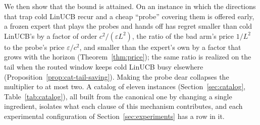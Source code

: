 \documentclass{article}
\theoremstyle{definition}
\theoremstyle{remark}
\newcommand{\eps}{\varepsilon}
\theoremstyle{remark}
\begin{document}
We then show that the bound is attained. On an instance in which the
directions that trap cold LinUCB recur and a cheap ``probe'' covering them is
offered early, a frozen expert that plays the probes and hands off has regret
smaller than cold LinUCB's by a factor of order $c^2/(\eps L^2)$, the ratio of
the bad arm's price $1/L^2$ to the probe's price $\eps/c^2$, and smaller than
the expert's own by a factor that grows with the horizon
(Theorem~\ref{thm:price}); the same ratio is realized on the tail when the
routed window keeps cold LinUCB busy elsewhere
(Proposition~\ref{prop:cat-tail-saving}). Making the probe dear collapses the
multiplier to at most two. A catalog of eleven instances
(Section~\ref{sec:catalog}, Table~\ref{tab:catalog}), all built from the
canonical one by changing a single ingredient, isolates what each clause of
this mechanism contributes, and each experimental configuration of
Section~\ref{sec:experiments} has a row in it.
\end{document}
